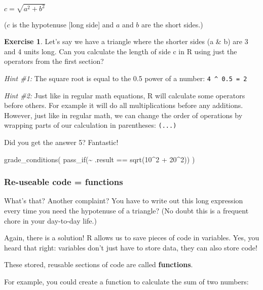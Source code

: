 \documentclass[
]{article}
\newenvironment{Shaded}{\begin{snugshade}}{\end{snugshade}}
\newcommand{\DecValTok}[1]{\textcolor[rgb]{0.00,0.00,0.81}{#1}}
\newcommand{\FunctionTok}[1]{\textcolor[rgb]{0.00,0.00,0.00}{#1}}
\newcommand{\NormalTok}[1]{#1}
\newcommand{\SpecialCharTok}[1]{\textcolor[rgb]{0.00,0.00,0.00}{#1}}
\theoremstyle{definition}
\theoremstyle{definition}
\theoremstyle{definition}
\newtheorem{exercise}{Exercise}[section]
\theoremstyle{definition}
\theoremstyle{remark}
\begin{document}
\(c = \sqrt{a^2 + b^2}\)

(\(c\) is the hypotenuse {[}long side{]} and \(a\) and \(b\) are the short sides.)

\begin{exercise}
Let's say we have a triangle where the shorter sides (a \& b) are 3 and 4 units long. Can you calculate the length of side c in R using just the operators from the first section?

\emph{Hint \#1:} The square root is equal to the 0.5 power of a number: \texttt{4\ \^{}\ 0.5\ =\ 2}

\emph{Hint \#2:} Just like in regular math equations, R will calculate some operators before others. For example it will do all multiplications before any additions. However, just like in regular math, we can change the order of operations by wrapping parts of our calculation in parentheses: \texttt{(...)}
\end{exercise}

Did you get the answer 5? Fantastic!

\begin{Shaded}
\begin{Highlighting}[]
\FunctionTok{grade\_conditions}\NormalTok{(}
  \FunctionTok{pass\_if}\NormalTok{(}\SpecialCharTok{\textasciitilde{}}\NormalTok{ .result }\SpecialCharTok{==} \FunctionTok{sqrt}\NormalTok{(}\DecValTok{10}\SpecialCharTok{\^{}}\DecValTok{2} \SpecialCharTok{+} \DecValTok{20}\SpecialCharTok{\^{}}\DecValTok{2}\NormalTok{))}
\NormalTok{)}
\end{Highlighting}
\end{Shaded}

\hypertarget{re-useable-code-functions}{%
\subsubsection{Re-useable code = functions}\label{re-useable-code-functions}}

What's that? Another complaint? You have to write out this long expression every time you need the hypotenuse of a triangle? (No doubt this is a frequent chore in your day-to-day life.)

Again, there is a solution! R allows us to save pieces of code in variables. Yes, you heard that right: variables don't just have to store data, they can also store code!

These stored, reusable sections of code are called \textbf{functions}.

For example, you could create a function to calculate the sum of two numbers:
\end{document}
